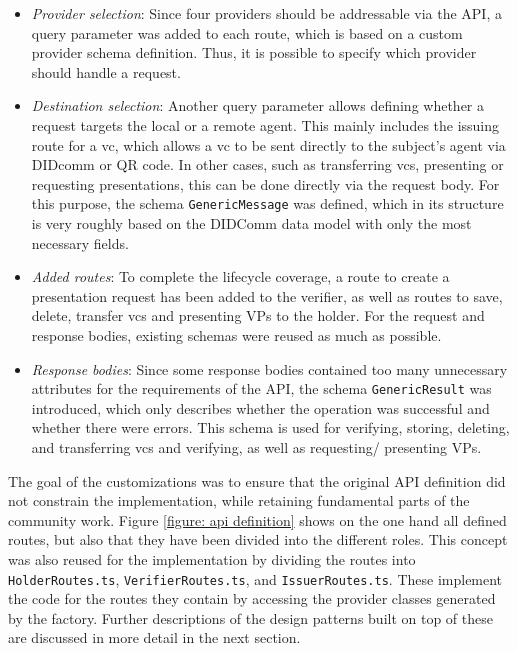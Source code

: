     \begin{itemize}
        \item \textit{Provider selection}: Since four providers should be addressable via the API, a query parameter was added to each route, which is based on a custom provider schema definition. Thus, it is possible to specify which provider should handle a request.
        \item \textit{Destination selection}: Another query parameter allows defining whether a request targets the local or a remote agent. This mainly includes the issuing route for a \ac{vc}, which allows a \ac{vc} to be sent directly to the subject's agent via DIDcomm or QR code. In other cases, such as transferring \acp{vc}, presenting or requesting presentations, this can be done directly via the request body. For this purpose, the schema \texttt{GenericMessage} was defined, which in its structure is very roughly based on the DIDComm data model with only the most necessary fields.
        \item \textit{Added routes}: To complete the lifecycle coverage, a route to create a presentation request has been added to the verifier, as well as routes to save, delete, transfer \acp{vc} and presenting \acp{VP} to the holder. For the request and response bodies, existing schemas were reused as much as possible.
        \item \textit{Response bodies}: Since some response bodies contained too many unnecessary attributes for the requirements of the API, the schema \texttt{GenericResult} was introduced, which only describes whether the operation was successful and whether there were errors. This schema is used for verifying, storing, deleting, and transferring \acp{vc} and verifying, as well as requesting/ presenting \acp{VP}.
    \end{itemize}
    
    The goal of the customizations was to ensure that the original API definition did not constrain the implementation, while retaining fundamental parts of the community work. Figure \ref{figure: api definition} shows on the one hand all defined routes, but also that they have been divided into the different roles. This concept was also reused for the implementation by dividing the routes into \texttt{HolderRoutes.ts}, \texttt{VerifierRoutes.ts}, and \texttt{IssuerRoutes.ts}. These implement the code for the routes they contain by accessing the provider classes generated by the factory. Further descriptions of the design patterns built on top of these are discussed in more detail in the next section. 

